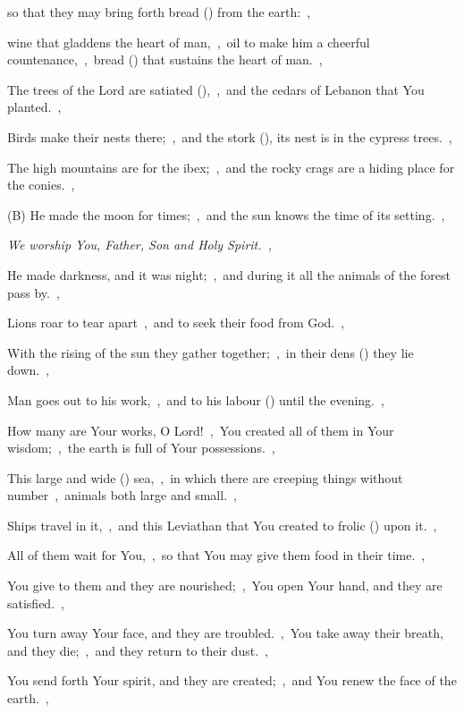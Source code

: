 \documentclass[12pt,twoside,a5paper]{article}
\begin{document}
\begin{normalparskip}
  so that they may bring forth bread () from the earth:~\sep

  wine that gladdens the heart of man,~\sep\ oil to make him a cheerful countenance,~\sep\ bread () that sustains the heart of man.~\sep

  The trees of the Lord are satiated (),~\sep\ and the cedars of Lebanon that You planted.~\sep

  Birds make their nests there;~\sep\ and the stork (), its nest is in the cypress trees.~\sep

  The high mountains are for the ibex;~\sep\ and the rocky crags are a hiding place for the conies.~\sep

  (B) He made the moon for times;~\sep\ and the sun knows the time of its setting.~\sep

  \emph{We worship You, Father, Son and Holy Spirit.~\sep}

  He made darkness, and it was night;~\sep\ and during it all the animals of the forest pass by.~\sep

  Lions roar to tear apart~\sep\ and to seek their food from God.~\sep

  With the rising of the sun they gather together;~\sep\ in their dens () they lie down.~\sep

  Man goes out to his work,~\sep\ and to his labour () until the evening.~\sep

  How many are Your works, O Lord!~\sep\ You created all of them in Your wisdom;~\sep\ the earth is full of Your possessions.~\sep

  This large and wide () sea,~\sep\ in which there are creeping things without number~\sep\ animals both large and small.~\sep

  Ships travel in it,~\sep\ and this Leviathan that You created to frolic () upon it.~\sep

  All of them wait for You,~\sep\ so that You may give them food in their time.~\sep

  You give to them and they are nourished;~\sep\ You open Your hand, and they are satisfied.~\sep

  You turn away Your face, and they are troubled.~\sep\ You take away their breath, and they die;~\sep\ and they return to their dust.~\sep

  You send forth Your spirit, and they are created;~\sep\ and You renew the face of the earth.~\sep


\end{normalparskip}
\end{document}
